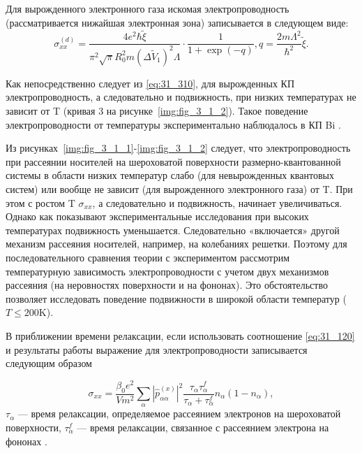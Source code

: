 Для вырожденного электронного газа искомая электропроводность (рассматривается нижайшая электронная зона) записывается в следующем виде:
\begin{equation} \label{eq:31_310}
\sigma _{xx}^{(d)} =\frac{4 e^2 \hbar \tilde{\xi }}{\pi^2 \sqrt{\pi } R_0^2 m \left(\Delta \tilde{V}_1 \right)^2 \Lambda } \cdot \frac{1}{1+{\exp}(-q)} , q=\frac{2m\Lambda^2 }{\hbar^2 } \tilde{\xi }.  
\end{equation}

Как непосредственно следует из \eqref{eq:31_310}, для вырожденных КП электропроводность, а следовательно и подвижность, при низких температурах не зависит от T (кривая 3 на рисунке~\ref{img:fig_3_1_2}). Такое поведение электропроводности от температуры экспериментально наблюдалось в КП Bi \cite{Lin2000,Heremans1998,Zhang2000,Heremans2000,Gitsu2003,Nikolaeva2006,Gitsu2005}.

Из рисунках~\ref{img:fig_3_1_1}-\ref{img:fig_3_1_2} следует, что электропроводность при рассеянии носителей на шероховатой поверхности размерно-квантованной системы в области низких температур слабо (для невырожденных квантовых систем) или вообще не зависит (для вырожденного электронного газа) от T. При этом с ростом T $\sigma _{xx} $, а следовательно и подвижность, начинает увеличиваться. Однако как показывают экспериментальные исследования \cite{Zhang2000,Gitsu2003,Nikolaeva2006} при высоких температурах подвижность уменьшается. Следовательно «включается» другой механизм рассеяния носителей, например, на колебаниях решетки. Поэтому для последовательного сравнения теории с экспериментом рассмотрим температурную зависимость электропроводности с учетом двух механизмов рассеяния (на неровностях поверхности и на фононах). Это обстоятельство позволяет исследовать поведение подвижности в широкой области температур ($T\le 200\text{K}$).

В приближении времени релаксации, если использовать соотношение \eqref{eq:31_120} и результаты работы \cite{Khamidullin2002} выражение для электропроводности записывается следующим образом

\begin{equation} \label{eq:31_320}
\sigma _{xx} =\frac{\beta_0 e^2 }{Vm^2 } \sum _{\alpha }\left|\hat{p}_{\alpha \alpha }^{(x)} \right|^{2} \frac{\tau _{\alpha } \tau_{\alpha }^f }{\tau_{\alpha } +\tau_{\alpha }^f } n_{\alpha } \left(1-n_{\alpha } \right),
\end{equation}
$\tau _{\alpha } $ --- время релаксации, определяемое рассеянием электронов на шероховатой поверхности, $\tau_{\alpha }^f $ --- время релаксации, связанное с рассеянием электрона на фононах \cite{Khamidullin2002}.

